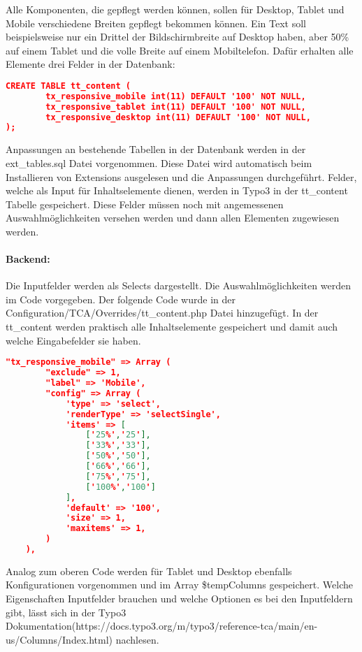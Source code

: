 Alle Komponenten, die gepflegt werden können, sollen für Desktop, Tablet und Mobile verschiedene Breiten gepflegt bekommen können. Ein Text soll beispielsweise nur ein Drittel der Bildschirmbreite auf Desktop haben, aber 50\% auf einem Tablet und die volle Breite auf einem Mobiltelefon. Dafür erhalten alle Elemente drei Felder in der Datenbank:
\begin{lstlisting}[language=json,firstnumber=1]
CREATE TABLE tt_content (
        tx_responsive_mobile int(11) DEFAULT '100' NOT NULL,
        tx_responsive_tablet int(11) DEFAULT '100' NOT NULL,
        tx_responsive_desktop int(11) DEFAULT '100' NOT NULL,
);
\end{lstlisting}
Anpassungen an bestehende Tabellen in der Datenbank werden in der ext\_tables.sql Datei vorgenommen. Diese Datei wird automatisch beim Installieren von Extensions ausgelesen und die Anpassungen durchgeführt. Felder, welche als Input für Inhaltselemente dienen, werden in Typo3 in der tt\_content Tabelle gespeichert. Diese Felder müssen noch mit angemessenen Auswahlmöglichkeiten versehen werden und dann allen Elementen zugewiesen werden.
\paragraph{Backend:} Die Inputfelder werden als Selects dargestellt. Die Auswahlmöglichkeiten werden im Code vorgegeben. Der folgende Code wurde in der Configuration/TCA/Overrides/tt\_content.php Datei hinzugefügt. In der tt\_content werden praktisch alle Inhaltselemente gespeichert und damit auch welche Eingabefelder sie haben.
\begin{lstlisting}[language=json,firstnumber=1]
"tx_responsive_mobile" => Array (
        "exclude" => 1,
        "label" => 'Mobile',
        "config" => Array (
            'type' => 'select',
            'renderType' => 'selectSingle',
            'items' => [
                ['25%','25'],
                ['33%','33'],
                ['50%','50'],
                ['66%','66'],
                ['75%','75'],
                ['100%','100']
            ],
            'default' => '100',
            'size' => 1,
            'maxitems' => 1,
        )
    ),
\end{lstlisting}
Analog zum oberen Code werden für Tablet und Desktop ebenfalls Konfigurationen vorgenommen und im Array \$tempColumns gespeichert. Welche Eigenschaften Inputfelder brauchen und welche Optionen es bei den Inputfeldern gibt, lässt sich in der Typo3 Dokumentation(https://docs.typo3.org/m/typo3/\newline reference-tca/main/en-us/Columns/Index.html) nachlesen. 

